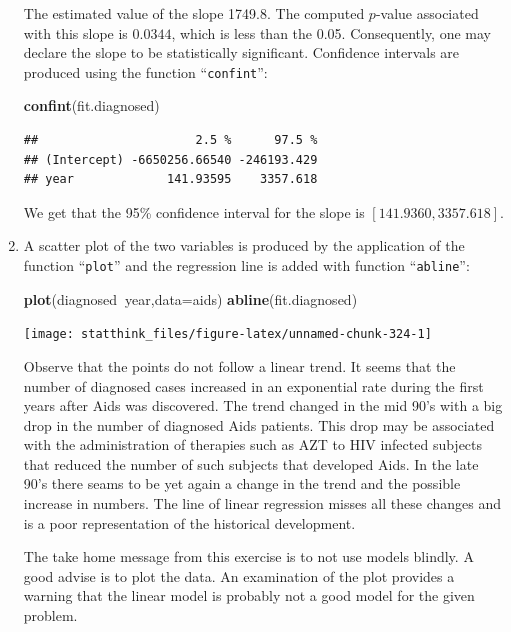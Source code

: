 \documentclass[]{krantz}
\makeatletter
\newenvironment{Shaded}{\begin{snugshade}}{\end{snugshade}}
\newcommand{\KeywordTok}[1]{\textcolor[rgb]{0.13,0.29,0.53}{\textbf{#1}}}
\newcommand{\DataTypeTok}[1]{\textcolor[rgb]{0.13,0.29,0.53}{#1}}
\newcommand{\OperatorTok}[1]{\textcolor[rgb]{0.81,0.36,0.00}{\textbf{#1}}}
\newcommand{\NormalTok}[1]{#1}
\newenvironment{kframe}{%
\medskip{}
\setlength{\fboxsep}{.8em}
 \def\at@end@of@kframe{}%
 \ifinner\ifhmode%
  \def\at@end@of@kframe{\end{minipage}}%
  \begin{minipage}{\columnwidth}%
 \fi\fi%
 \def\FrameCommand##1{\hskip\@totalleftmargin \hskip-\fboxsep
 \colorbox{shadecolor}{##1}\hskip-\fboxsep
     \hskip-\linewidth \hskip-\@totalleftmargin \hskip\columnwidth}%
 \MakeFramed {\advance\hsize-\width
   \@totalleftmargin\z@ \linewidth\hsize
   \@setminipage}}%
 {\par\unskip\endMakeFramed%
 \at@end@of@kframe}
\renewenvironment{Shaded}{\begin{kframe}}{\end{kframe}}
\theoremstyle{definition}
\theoremstyle{definition}
\theoremstyle{definition}
\theoremstyle{remark}
\makeatother
\begin{document}
\begin{enumerate}
  The estimated value of the slope 1749.8. The computed \(p\)-value
  associated with this slope is \(0.0344\), which is less than the 0.05.
  Consequently, one may declare the slope to be statistically
  significant. Confidence intervals are produced using the function
  ``\texttt{confint}'':

\begin{Shaded}
\begin{Highlighting}[]
\KeywordTok{confint}\NormalTok{(fit.diagnosed)}
\end{Highlighting}
\end{Shaded}

\begin{verbatim}
##                      2.5 %      97.5 %
## (Intercept) -6650256.66540 -246193.429
## year             141.93595    3357.618
\end{verbatim}

  We get that the 95\% confidence interval for the slope is
  \([141.9360, 3357.618]\).
\item
  A scatter plot of the two variables is produced by the application of
  the function ``\texttt{plot}'' and the regression line is added with
  function ``\texttt{abline}'':

\begin{Shaded}
\begin{Highlighting}[]
\KeywordTok{plot}\NormalTok{(diagnosed}\OperatorTok{~}\NormalTok{year,}\DataTypeTok{data=}\NormalTok{aids)}
\KeywordTok{abline}\NormalTok{(fit.diagnosed)}
\end{Highlighting}
\end{Shaded}

  \begin{center}\texttt{[image: statthink\_files/figure-latex/unnamed-chunk-324-1]} \end{center}

  Observe that the points do not follow a linear trend. It seems that
  the number of diagnosed cases increased in an exponential rate during
  the first years after Aids was discovered. The trend changed in the
  mid 90's with a big drop in the number of diagnosed Aids patients.
  This drop may be associated with the administration of therapies such
  as AZT to HIV infected subjects that reduced the number of such
  subjects that developed Aids. In the late 90's there seams to be yet
  again a change in the trend and the possible increase in numbers. The
  line of linear regression misses all these changes and is a poor
  representation of the historical development.

  The take home message from this exercise is to not use models blindly.
  A good advise is to plot the data. An examination of the plot provides
  a warning that the linear model is probably not a good model for the
  given problem.
\end{enumerate}
\end{document}

